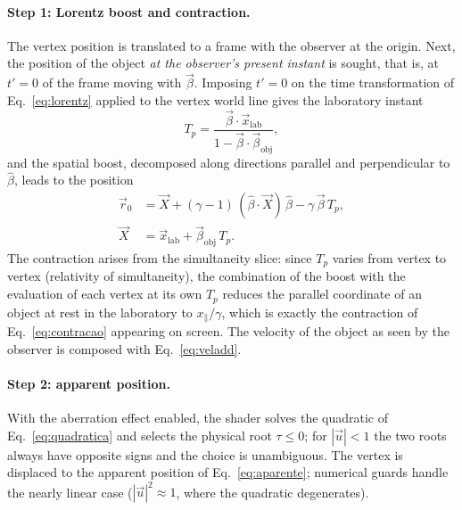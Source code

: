 \documentclass[10pt,a4paper,twocolumn]{article}
\begin{document}
\paragraph{Step 1: Lorentz boost and contraction.} The vertex position is translated to a
frame with the observer at the origin. Next, the position of the object \emph{at the
observer's present instant} is sought, that is, at $t' = 0$ of the frame moving with
$\vec{\beta}$. Imposing $t' = 0$ on the time transformation of Eq.~\eqref{eq:lorentz}
applied to the vertex world line gives the laboratory instant
\begin{equation}
  T_{p} = \frac{\vec{\beta}\cdot\vec{x}_{\mathrm{lab}}}
               {1 - \vec{\beta}\cdot\vec{\beta}_{\mathrm{obj}}},
  \label{eq:tp}
\end{equation}
and the spatial boost, decomposed along directions parallel and perpendicular to
$\hat{\beta}$, leads to the position
\begin{equation}
  \begin{aligned}
    \vec{r}_{0} &= \vec{X} + (\gamma - 1)\,(\hat{\beta}\cdot\vec{X})\,\hat{\beta}
                   - \gamma\,\vec{\beta}\,T_{p},\\
    \vec{X} &= \vec{x}_{\mathrm{lab}} + \vec{\beta}_{\mathrm{obj}}\,T_{p}.
  \end{aligned}
  \label{eq:boost}
\end{equation}
The contraction arises from the simultaneity slice: since $T_{p}$ varies from vertex to
vertex (relativity of simultaneity), the combination of the boost with the evaluation of
each vertex at its own $T_{p}$ reduces the parallel coordinate of an object at rest in
the laboratory to $x_{\parallel}/\gamma$, which is exactly the contraction of
Eq.~\eqref{eq:contracao} appearing on screen. The velocity of the object as seen by the
observer is composed with Eq.~\eqref{eq:veladd}.

\paragraph{Step 2: apparent position.} With the aberration effect enabled, the shader
solves the quadratic of Eq.~\eqref{eq:quadratica} and selects the physical root
$\tau \leq 0$; for $|\vec{u}| < 1$ the two roots always have opposite signs and the
choice is unambiguous. The vertex is displaced to the apparent position of
Eq.~\eqref{eq:aparente}; numerical guards handle the nearly linear case
($|\vec{u}|^{2} \approx 1$, where the quadratic degenerates).
\end{document}
